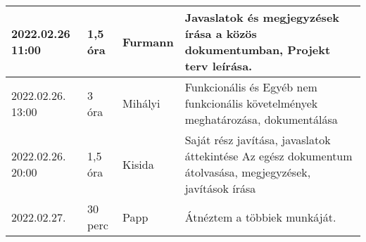 \begin{tabularx}{\textwidth}{|p{2cm}|l|l|X|}
	\hline
	2022.02.26 11:00  & 1,5 óra   & Furmann    & Javaslatok és megjegyzések írása a közös dokumentumban, Projekt terv leírása.                                                                                                                                                                                                                                                                                                                                                                                                                                                                                                                                                                  \\
	\hline
	2022.02.26. 13:00 & 3 óra     & Mihályi    & Funkcionális és Egyéb nem funkcionális követelmények meghatározása, dokumentálása                                                                                                                                                                                                                                                                                                                                                                                                                                                                                                                                                              \\
	\hline
	2022.02.26. 20:00 & 1,5 óra   & Kisida     & Saját rész javítása, javaslatok áttekintése Az egész dokumentum átolvasása, megjegyzések, javítások írása                                                                                                                                                                                                                                                                                                                                                                                                                                                                                                                                      \\
	\hline
	2022.02.27.       & 30 perc   & Papp       & Átnéztem a többiek munkáját.                                                                                                                                                                                                                                                                                                                                                                                                                                                                                                                                                                                                                   \\

\end{tabularx}
